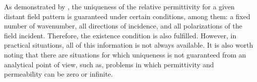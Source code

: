 			As demonstrated by \cite{colton1992uniqueness}, the uniqueness of the relative permittivity for a given distant field pattern is guaranteed under certain conditions, among them: a fixed number of wavenumber, all directions of incidence, and all polarizations of the field incident. Therefore, the existence condition is also fulfilled. However, in practical situations, all of this information is not always available. It is also worth noting that there are situations for which uniqueness is not guaranteed from an analytical point of view, such as, problems in which permittivity and permeability can be zero or infinite.
			
